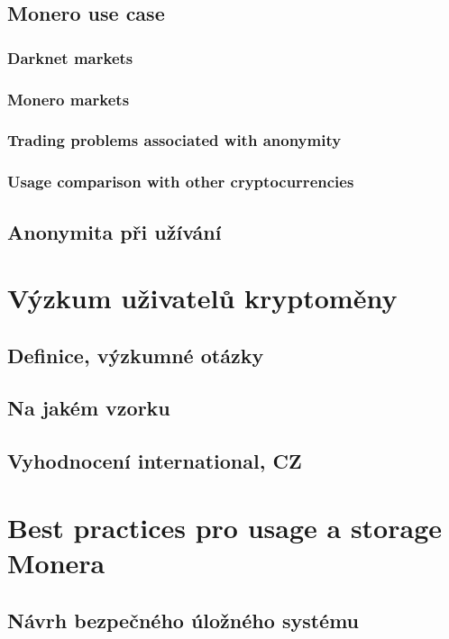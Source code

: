 \documentclass[
  printed, %
  table,   %
  nolof,     %
  nolot,     %
           oneside, color
]{fithesis3}
\begin{document}
\section{Monero use case}

\subsection{Darknet markets}

\subsection{Monero markets}

\subsection{Trading problems associated with anonymity}

\subsection{Usage comparison with other cryptocurrencies}


\section{Anonymita při užívání}

\chapter{Výzkum uživatelů kryptoměny}
\section{Definice, výzkumné otázky}
\section{Na jakém vzorku}
\section{Vyhodnocení international, CZ}

\chapter{Best practices pro usage a storage Monera}
\section{Návrh bezpečného úložného systému}
\end{document}
